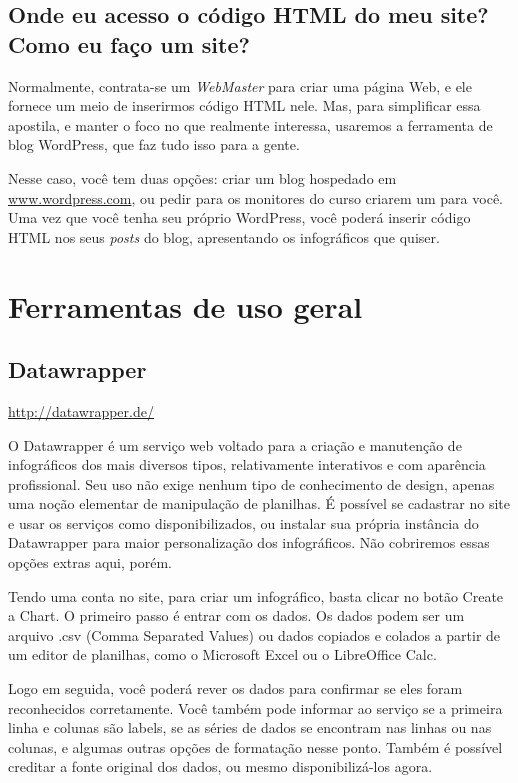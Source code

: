 \documentclass[12pt,onecolumn]{article}
\begin{document}
  \subsection{Onde eu acesso o código HTML do meu site? Como eu faço um site?}
    Normalmente, contrata-se um \textit{WebMaster} para criar uma página Web, e
    ele fornece um meio de inserirmos código HTML nele. Mas, para simplificar
    essa apostila, e manter o foco no que realmente interessa, usaremos a
    ferramenta de blog WordPress, que faz tudo isso para a gente.
    
    Nesse caso, você tem duas opções: criar um blog hospedado em
    \url{www.wordpress.com}, ou pedir para os monitores do curso criarem um
    para você\footnotemark. Uma vez que você tenha seu próprio WordPress, você
    poderá inserir código HTML nos seus \textit{posts} do blog, apresentando os
    infográficos que quiser.
    

\clearpage
\section{Ferramentas de uso geral}
  \subsection{Datawrapper}
    \url{http://datawrapper.de/}
    
    O Datawrapper é um serviço web voltado para a criação e manutenção de
    infográficos dos mais diversos tipos, relativamente interativos e com
    aparência profissional. Seu uso não exige nenhum tipo de conhecimento de
    design, apenas uma noção elementar de manipulação de planilhas. É possível
    se cadastrar no site e usar os serviços como disponibilizados, ou instalar
    sua própria instância do Datawrapper para maior personalização dos
    infográficos. Não cobriremos essas opções extras aqui, porém.
    
    Tendo uma conta no site, para criar um infográfico, basta clicar no botão 
    Create a Chart. O primeiro passo é entrar com os dados. Os dados podem ser 
    um arquivo .csv (Comma Separated Values) ou dados copiados e colados a partir
    de um editor de planilhas, como o Microsoft Excel ou o LibreOffice Calc.
    
    Logo em seguida, você poderá rever os dados para confirmar se eles foram
    reconhecidos corretamente. Você também pode informar ao serviço se a primeira
    linha e colunas são labels, se as séries de dados se encontram nas linhas ou
    nas colunas, e algumas outras opções de formatação nesse ponto. Também é
    possível creditar a fonte original dos dados, ou mesmo disponibilizá-los agora.
    
\end{document}
